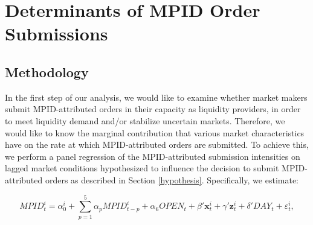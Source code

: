 \documentclass{article}
\begin{document}
\section{Determinants of MPID Order Submissions}\label{determinants}

\subsection{Methodology}\label{method1}

In the first step of our analysis, we would like to examine whether market makers submit MPID-attributed orders in their capacity as liquidity providers, in order to meet liquidity demand and/or stabilize uncertain markets. Therefore, we would like to know the marginal contribution that various market characteristics have on the rate at which MPID-attributed orders are submitted. To achieve this, we perform a panel regression of the MPID-attributed submission intensities on lagged market conditions hypothesized to influence the decision to submit MPID-attributed orders as described in Section \ref{hypothesis}. Specifically, we estimate:

\begin{equation}
MPID_t^i=\alpha_0^i + \sum_{p=1}^5 \alpha_p MPID_{t-p}^i +\alpha_6 OPEN_t + \beta' \textbf{x}_t^i + \gamma' \textbf{z}_t^i + \delta' DAY_t +\varepsilon_{t}^i, \label{prepanel}
\end{equation}
\end{document}
